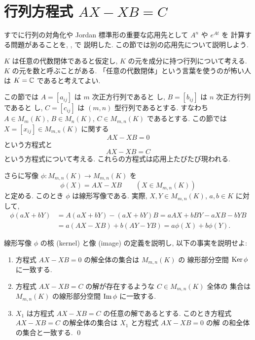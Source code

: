 \documentclass[12pt,twoside]{jarticle}
\begin{document}

\section{行列方程式 $AX-XB=C$}
\label{sec:AX-XB=C}

すでに行列の対角化や Jordan 標準形の重要な応用先として $A^n$ や $e^{At}$ を
計算する問題があることを, , で
説明した.  この節では別の応用先について説明しよう.

$K$ は任意の代数閉体であると仮定し, $K$ の元を成分に持つ行列について考える.
$K$ の元を数と呼ぶことがある. 「任意の代数閉体」という言葉を使うのが怖い人
は $K={\mathbb C}$ であると考えてよい.

この節では $A=[a_{ij}]$ は $m$ 次正方行列であると
し, $B=[b_{ij}]$ は $n$ 次正方行列であると
し, $C=[c_{ij}]$ は $(m,n)$ 型行列であるとする.  
すなわち $A\in M_m(K)$, $B\in M_n(K)$, $C\in M_{m,n}(K)$ であるとする.
この節では $X=[x_{ij}]\in M_{m,n}(K)$ に関する
\begin{equation*}
  AX - XB = 0
\end{equation*}
という方程式と
\begin{equation*}
  AX - XB = C
\end{equation*}
という方程式について考える.  これらの方程式は応用上たびたび現われる.

さらに写像 $\phi:M_{m,n}(K)\to M_{m,n}(K)$ を
\begin{equation*}
  \phi(X) = AX - XB
  \qquad (X\in M_{m,n}(K))
\end{equation*}
と定める. このとき $\phi$ は線形写像である. 
実際, $X,Y\in M_{m,n}(K)$, $a,b\in K$ に対して, 
\begin{align*}
  \phi(aX+bY) 
  & = A(aX+bY)-(aX+bY)B = aAX + bBY - aXB - bYB
  \\ &
  = a(AX-XB) + b(AY-YB) = a\phi(X) + b\phi(Y).
\end{align*}


\begin{question}
\label{q:Ker-phi-Image-phi}
  線形写像 $\phi$ の核 (kernel) と像 (image) の定義を説明し, 
  以下の事実を説明せよ:
  \begin{enumerate}
  \item 方程式 $AX-XB=0$ の解全体の集合は $M_{m,n}(K)$ の
    線形部分空間 $\mathop{\mathrm{Ker}}\nolimits\phi$ に一致する.
  \item 方程式 $AX-XB=C$ の解が存在するような $C\in M_{m,n}(K)$ 全体の
    集合は $M_{m,n}(K)$ の線形部分空間 $\mathop{\mathrm{Im}}\nolimits\phi$ に一致する.
  \item $X_1$ は方程式 $AX-XB=C$ の任意の解であるとする.  
    このとき方程式 $AX-XB=C$ の解全体の集合は $X_1$ と方程式 $AX-XB=0$ の解
    の和全体の集合と一致する.
    \qed
  \end{enumerate}
\end{question}
\end{document}
